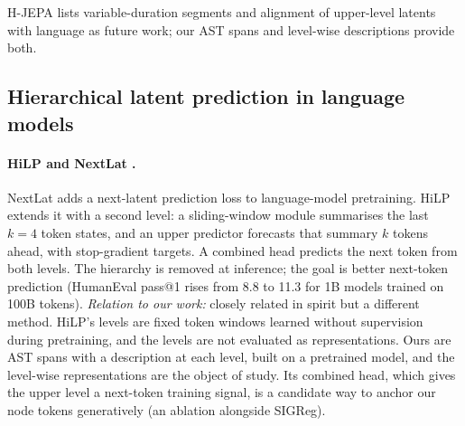 \documentclass[11pt]{article}
\begin{document}
H-JEPA lists variable-duration segments and alignment of upper-level latents with language as future work; our AST
spans and level-wise descriptions provide both.

\subsection{Hierarchical latent prediction in language models}

\paragraph{HiLP \citep{shi2026hilp} and NextLat \citep{teoh2025nextlat}.}
NextLat adds a next-latent prediction loss to language-model pretraining. HiLP extends it with a second level: a
sliding-window module summarises the last $k=4$ token states, and an upper predictor forecasts that summary $k$
tokens ahead, with stop-gradient targets. A combined head predicts the next token from both levels. The hierarchy is
removed at inference; the goal is better next-token prediction (HumanEval pass@1 rises from 8.8 to 11.3 for 1B models
trained on 100B tokens).
\emph{Relation to our work:} closely related in spirit but a different method. HiLP's levels are fixed token windows
learned without supervision during pretraining, and the levels are not evaluated as representations. Ours are AST
spans with a description at each level, built on a pretrained model, and the level-wise representations are the
object of study. Its combined head, which gives the upper level a next-token training signal, is a candidate way to
anchor our node tokens generatively (an ablation alongside SIGReg).
\end{document}
